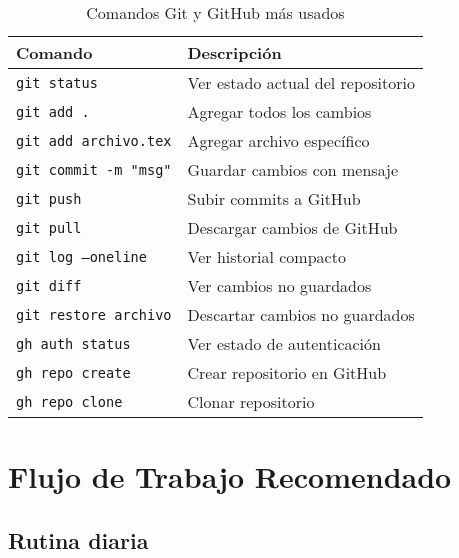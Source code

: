\documentclass[12pt,a4paper]{article}
\begin{document}
\begin{table}[h!]
\centering
\small
\begin{tabular}{|l|p{8cm}|}
\hline
\textbf{Comando} & \textbf{Descripción} \\
\hline
\texttt{git status} & Ver estado actual del repositorio \\
\hline
\texttt{git add .} & Agregar todos los cambios \\
\hline
\texttt{git add archivo.tex} & Agregar archivo específico \\
\hline
\texttt{git commit -m "msg"} & Guardar cambios con mensaje \\
\hline
\texttt{git push} & Subir commits a GitHub \\
\hline
\texttt{git pull} & Descargar cambios de GitHub \\
\hline
\texttt{git log --oneline} & Ver historial compacto \\
\hline
\texttt{git diff} & Ver cambios no guardados \\
\hline
\texttt{git restore archivo} & Descartar cambios no guardados \\
\hline
\texttt{gh auth status} & Ver estado de autenticación \\
\hline
\texttt{gh repo create} & Crear repositorio en GitHub \\
\hline
\texttt{gh repo clone} & Clonar repositorio \\
\hline
\end{tabular}
\caption{Comandos Git y GitHub más usados}
\end{table}

\section{Flujo de Trabajo Recomendado}

\subsection{Rutina diaria}
\end{document}
